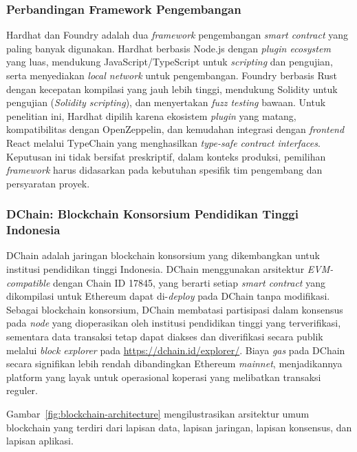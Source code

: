 \subsubsection{Perbandingan Framework Pengembangan}

Hardhat \cite{hardhat} dan Foundry \cite{foundry} adalah dua \textit{framework} pengembangan \textit{smart contract} yang paling banyak digunakan. Hardhat berbasis Node.js dengan \textit{plugin ecosystem} yang luas, mendukung JavaScript/TypeScript untuk \textit{scripting} dan pengujian, serta menyediakan \textit{local network} untuk pengembangan. Foundry berbasis Rust dengan kecepatan kompilasi yang jauh lebih tinggi, mendukung Solidity untuk pengujian (\textit{Solidity scripting}), dan menyertakan \textit{fuzz testing} bawaan. Untuk penelitian ini, Hardhat dipilih karena ekosistem \textit{plugin} yang matang, kompatibilitas dengan OpenZeppelin, dan kemudahan integrasi dengan \textit{frontend} React melalui TypeChain yang menghasilkan \textit{type-safe contract interfaces}. Keputusan ini tidak bersifat preskriptif, dalam konteks produksi, pemilihan \textit{framework} harus didasarkan pada kebutuhan spesifik tim pengembang dan persyaratan proyek.

\subsubsection{DChain: Blockchain Konsorsium Pendidikan Tinggi Indonesia}

DChain adalah jaringan blockchain konsorsium yang dikembangkan untuk institusi pendidikan tinggi Indonesia. DChain menggunakan arsitektur \textit{EVM-compatible} dengan Chain ID 17845, yang berarti setiap \textit{smart contract} yang dikompilasi untuk Ethereum dapat di-\textit{deploy} pada DChain tanpa modifikasi. Sebagai blockchain konsorsium, DChain membatasi partisipasi dalam konsensus pada \textit{node} yang dioperasikan oleh institusi pendidikan tinggi yang terverifikasi, sementara data transaksi tetap dapat diakses dan diverifikasi secara publik melalui \textit{block explorer} pada \url{https://dchain.id/explorer/}. Biaya \textit{gas} pada DChain secara signifikan lebih rendah dibandingkan Ethereum \textit{mainnet}, menjadikannya platform yang layak untuk operasional koperasi yang melibatkan transaksi reguler.

Gambar~\ref{fig:blockchain-architecture} mengilustrasikan arsitektur umum blockchain yang terdiri dari lapisan data, lapisan jaringan, lapisan konsensus, dan lapisan aplikasi.

